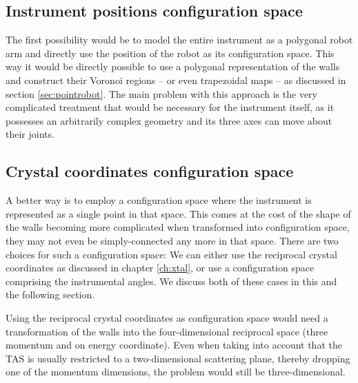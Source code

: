 \subsection{Instrument positions configuration space}
The first possibility would be to model the entire instrument as a polygonal 
robot arm and directly use the position of the robot as its configuration space. 
This way it would be directly possible to use a polygonal representation of the 
walls and construct their Voronoi regions -- or even trapezoidal maps -- as 
discussed in section \ref{sec:pointrobot}. The main problem with this approach 
is the very complicated treatment that would be necessary for the instrument 
itself, as it possesses an arbitrarily complex geometry and its three axes
can move about their joints.


\subsection{Crystal coordinates configuration space}
A better way is to employ a configuration space where the instrument is represented 
as a single point in that space. 
This comes at the cost of the shape of the walls becoming more complicated when 
transformed into configuration space, they may not even be simply-connected 
any more in that space. 
There are two choices for such a configuration space: We can either use the 
reciprocal crystal coordinates as discussed in chapter \ref{ch:xtal}, or use a 
configuration space comprising the instrumental angles.
We discuss both of these cases in this and the following section.

Using the reciprocal crystal coordinates as configuration space would need a 
transformation of the walls into the four-dimensional reciprocal space 
(three momentum and on energy coordinate). Even when taking into account that 
the TAS is usually restricted to a two-dimensional scattering plane, thereby 
dropping one of the momentum dimensions, the problem would still be three-dimensional.

